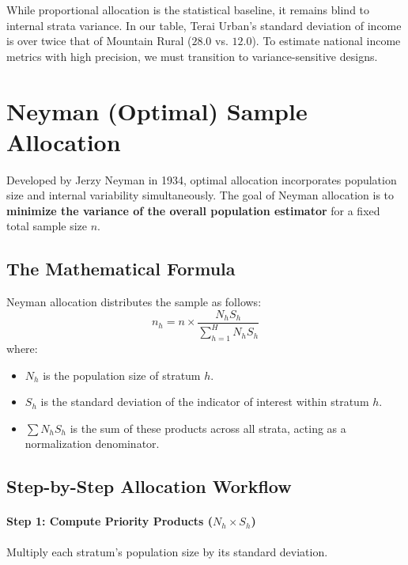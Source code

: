 \documentclass[11pt, a4paper]{article}
\begin{document}
While proportional allocation is the statistical baseline, it remains blind to internal strata variance. In our table, Terai Urban's standard deviation of income is over twice that of Mountain Rural ($28.0$ vs. $12.0$). To estimate national income metrics with high precision, we must transition to variance-sensitive designs.

\newpage

\section{Neyman (Optimal) Sample Allocation}

Developed by Jerzy Neyman in 1934, optimal allocation incorporates population size and internal variability simultaneously. The goal of Neyman allocation is to \textbf{minimize the variance of the overall population estimator} for a fixed total sample size $n$.

\subsection{The Mathematical Formula}
Neyman allocation distributes the sample as follows:
\begin{equation}
    n_h = n \times \frac{N_h S_h}{\sum_{h=1}^H N_h S_h}
\end{equation}
where:
\begin{itemize}
    \item $N_h$ is the population size of stratum $h$.
    \item $S_h$ is the standard deviation of the indicator of interest within stratum $h$.
    \item $\sum N_h S_h$ is the sum of these products across all strata, acting as a normalization denominator.
\end{itemize}

\subsection{Step-by-Step Allocation Workflow}

\paragraph{Step 1: Compute Priority Products ($N_h \times S_h$)}
Multiply each stratum's population size by its standard deviation.
\end{document}
